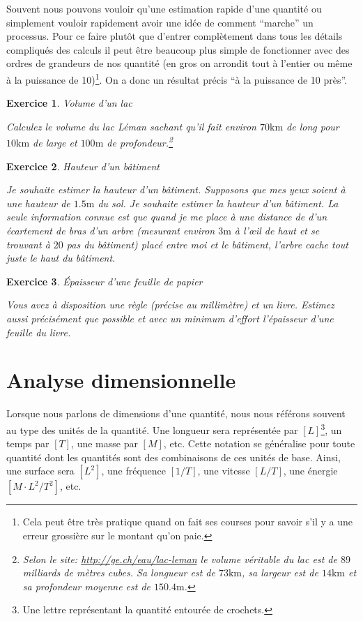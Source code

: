 \documentclass[a4paper,12pt]{book}
\newtheorem{exercice}{Exercice}
\newcommand{\km}{\mathrm{km}}
\newcommand{\m}{\mathrm{m}}
\begin{document}
Souvent nous pouvons vouloir qu'une estimation rapide d'une quantité ou simplement vouloir rapidement avoir une idée 
de comment ``marche'' un processus. Pour ce faire plutôt que d'entrer complètement dans tous les détails compliqués des calculs
il peut être beaucoup plus simple de fonctionner avec des ordres de grandeurs de nos quantité (en gros on arrondit tout à l'entier ou même 
à la puissance de 10)\footnote{Cela peut être très pratique quand on fait ses courses pour savoir s'il y a une erreur grossière sur le montant qu'on paie.}.
On a donc un résultat précis ``à la puissance de 10 près''. 
\begin{exercice}{Volume d'un lac}

 Calculez le volume du lac Léman sachant qu'il fait environ $70\km$ de long pour $10\km$ de large et $100\m$ de profondeur.\footnote{Selon le site: \url{http://ge.ch/eau/lac-leman} le volume véritable du lac est de $89$ milliards de mètres cubes. Sa longueur est de $73\km$, sa largeur est de $14\km$ et sa profondeur moyenne est de $150.4\m$.}
\end{exercice}
\begin{exercice}{Hauteur d'un bâtiment}

Je souhaite estimer la hauteur d'un bâtiment. Supposons que mes yeux soient à une hauteur de $1.5\m$ du sol. Je souhaite estimer la hauteur d'un bâtiment. La seule information connue est que quand je me place 
à une distance de d'un écartement de bras d'un arbre (mesurant environ $3\m$ à l’œil de haut et se trouvant à $20$ pas du bâtiment) placé entre moi et le bâtiment, 
l'arbre cache tout juste le haut du bâtiment.
\end{exercice}

\begin{exercice}{Épaisseur d'une feuille de papier}

Vous avez à disposition une règle (précise au millimètre) et un livre. 
Estimez aussi précisément que possible et avec un minimum d'effort
l'épaisseur d'une feuille du livre.
\end{exercice}

\section{Analyse dimensionnelle}

Lorsque nous parlons de dimensions d'une quantité, nous nous référons souvent au type des unités de la quantité. Une longueur 
sera représentée par $[L]$\footnote{Une lettre représentant la quantité entourée de crochets.}, un temps par $[T]$, une masse par $[M]$, etc.
Cette notation se généralise pour toute quantité dont les quantités sont des combinaisons de ces unités de base. Ainsi, une surface sera $[L^2]$,
une fréquence $[1/T]$, une vitesse $[L/T]$, une énergie $[M\cdot L^2/T^2]$, etc.
\end{document}
